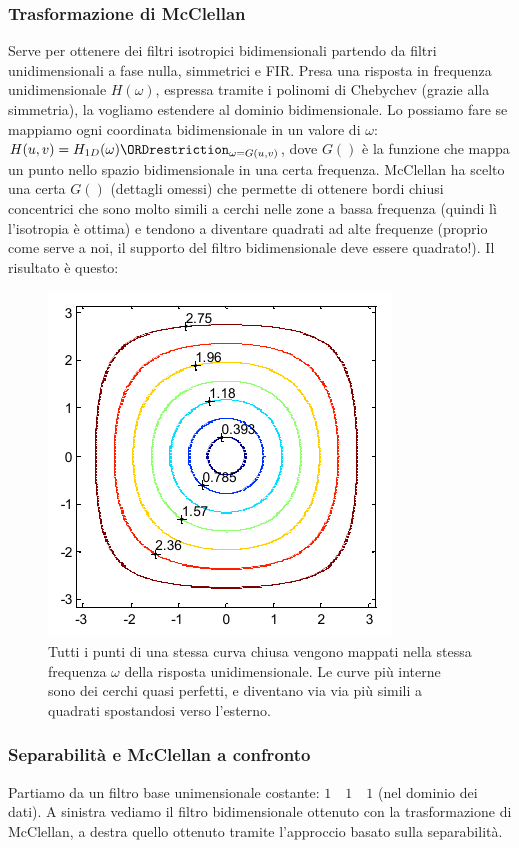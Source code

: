 \documentclass[a4paper,11pt]{article}
\begin{document}
\subsubsection{Trasformazione di McClellan}
Serve per ottenere dei filtri isotropici bidimensionali partendo da filtri unidimensionali a fase nulla, simmetrici e FIR.
Presa una risposta in frequenza unidimensionale $H(\omega)$, espressa tramite i polinomi di Chebychev (grazie alla simmetria), la vogliamo estendere al dominio bidimensionale. Lo possiamo fare
se mappiamo ogni coordinata bidimensionale in un valore di $\omega$: $H(u,v) = H_{1D}(\omega)\ORDrestriction_{\omega = G(u,v)}$,
dove $G()$ è la funzione che mappa un punto nello spazio bidimensionale in una certa frequenza. McClellan ha scelto una certa $G()$ (dettagli omessi)
che permette di ottenere bordi chiusi concentrici che sono molto simili a cerchi nelle zone a bassa frequenza (quindi lì l'isotropia è ottima)
e tendono a diventare quadrati ad alte frequenze (proprio come serve a noi, il supporto del filtro bidimensionale deve essere
quadrato!). Il risultato è questo:

\renewcommand{\thefigure}{6.7}
\begin{figure}[!h]
  \centering
    \includegraphics[scale=0.6]{images/6/mcclellan.png}
    \caption{Tutti i punti di una stessa curva chiusa vengono mappati nella stessa frequenza $\omega$ della risposta unidimensionale. Le curve più interne sono dei cerchi quasi perfetti,
    e diventano via via più simili a quadrati spostandosi verso l'esterno.}
\end{figure}

\subsubsection{Separabilità e McClellan a confronto}
Partiamo da un filtro base unimensionale costante: $1 \quad 1 \quad 1$ (nel dominio dei dati). A sinistra vediamo il filtro bidimensionale ottenuto con la trasformazione di McClellan,
a destra quello ottenuto tramite l'approccio basato sulla separabilità.
\end{document}
